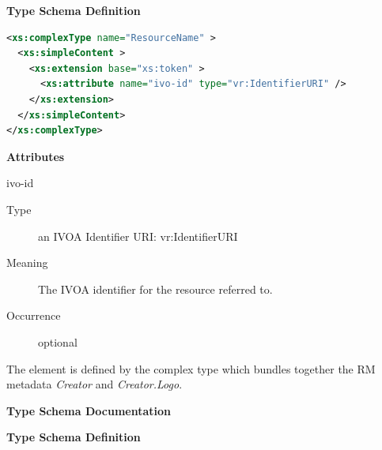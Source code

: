 \documentclass[11pt,a4paper]{ivoa}
\begin{document}

\vspace{1ex}\noindent\textbf{ Type Schema Definition}

\begin{lstlisting}[language=XML,basicstyle=\footnotesize]
<xs:complexType name="ResourceName" >
  <xs:simpleContent >
    <xs:extension base="xs:token" >
      <xs:attribute name="ivo-id" type="vr:IdentifierURI" />
    </xs:extension>
  </xs:simpleContent>
</xs:complexType>
\end{lstlisting}

\vspace{0.5ex}\noindent\textbf{ Attributes}

\begingroup\small\begin{bigdescription}
\item[ivo-id]
\begin{description}
\item[Type] an IVOA Identifier URI: vr:IdentifierURI
\item[Meaning] 
                The IVOA identifier for the resource referred to.
              
\item[Occurrence] optional

\end{description}


\end{bigdescription}\endgroup

\endgroup


The  element is defined by the  complex
type which bundles together the RM metadata \emph{Creator} and
\emph{Creator.Logo}.



\begingroup
      	\renewcommand*\descriptionlabel[1]{%
      	\hbox to 5.5em{\emph{#1}\hfil}}\vspace{2ex}\noindent\textbf{ Type Schema Documentation}


\vspace{1ex}\noindent\textbf{ Type Schema Definition}
\end{document}
